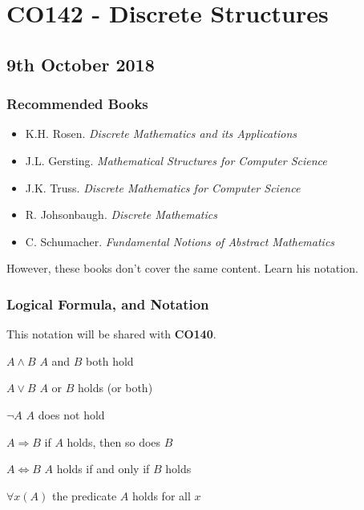 \documentclass[a4paper, 12pt]{article}
\begin{document}
    \section*{CO142 - Discrete Structures}
        \subsection*{9th October 2018}
            \subsubsection*{Recommended Books}
                \begin{itemize}
                    \item K.H. Rosen. \textit{Discrete Mathematics and its Applications}
                    \item J.L. Gersting. \textit{Mathematical Structures for Computer Science}
                    \item J.K. Truss. \textit{Discrete Mathematics for Computer Science}
                    \item R. Johsonbaugh. \textit{Discrete Mathematics}
                    \item C. Schumacher. \textit{Fundamental Notions of Abstract Mathematics}
                \end{itemize}
                However, these books don't cover the same content. Learn his notation.
            \subsubsection*{Logical Formula, and Notation}
                This notation will be shared with \textbf{CO140}.
                \medskip

                $A \land B$ \hfill $A$ and $B$ both hold
                \smallskip

                $A \lor B$ \hfill $A$ or $B$ holds (or both)
                \smallskip

                $\neg A$ \hfill $A$ does not hold
                \smallskip

                $A \Rightarrow B$ \hfill if $A$ holds, then so does $B$
                \smallskip

                $A \Leftrightarrow B$ \hfill $A$ holds if and only if $B$ holds
                \smallskip

                $\forall x (A)$ \hfill the predicate $A$ holds for all $x$
                \smallskip
\end{document}
